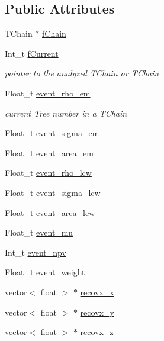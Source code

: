 \subsection*{Public Attributes}
\begin{DoxyCompactItemize}
\item 
T\+Chain $\ast$ \hyperlink{classXMLWriter_ac2efafff4308bbb27611c5d68b3700e1}{f\+Chain}
\item 
Int\+\_\+t \hyperlink{classXMLWriter_a48338ffb60a2aedec6db2f6695a967e5}{f\+Current}
\begin{DoxyCompactList}\small\item\em pointer to the analyzed T\+Chain or T\+Chain \end{DoxyCompactList}\item 
Float\+\_\+t \hyperlink{classXMLWriter_a792eee50e64e8475c85fe1feb31ad006}{event\+\_\+rho\+\_\+em}
\begin{DoxyCompactList}\small\item\em current Tree number in a T\+Chain \end{DoxyCompactList}\item 
Float\+\_\+t \hyperlink{classXMLWriter_aa34c15e694c8ea7cb6940104df3b2dd7}{event\+\_\+sigma\+\_\+em}
\item 
Float\+\_\+t \hyperlink{classXMLWriter_a815901645b4cb90c09124af8c8236e07}{event\+\_\+area\+\_\+em}
\item 
Float\+\_\+t \hyperlink{classXMLWriter_abc35debd3b3fb2b4560d7c344e8c40b3}{event\+\_\+rho\+\_\+lcw}
\item 
Float\+\_\+t \hyperlink{classXMLWriter_af6bc674bca504ca028b1f3cb14880677}{event\+\_\+sigma\+\_\+lcw}
\item 
Float\+\_\+t \hyperlink{classXMLWriter_a95de441bd545a6a6bf5d0c898daa8559}{event\+\_\+area\+\_\+lcw}
\item 
Float\+\_\+t \hyperlink{classXMLWriter_a05034f399d8605897b91c4b26a493a56}{event\+\_\+mu}
\item 
Int\+\_\+t \hyperlink{classXMLWriter_a2d3d5505eba607f6e335f25861086c09}{event\+\_\+npv}
\item 
Float\+\_\+t \hyperlink{classXMLWriter_af616379fb3ce609eb1d5bfa91cc0ba09}{event\+\_\+weight}
\item 
vector$<$ float $>$ $\ast$ \hyperlink{classXMLWriter_a565b883f221ca87147a5bedaedd097f3}{recovx\+\_\+x}
\item 
vector$<$ float $>$ $\ast$ \hyperlink{classXMLWriter_ad8416f28ca25bf8dc1bec17a80acc742}{recovx\+\_\+y}
\item 
vector$<$ float $>$ $\ast$ \hyperlink{classXMLWriter_ad27ad3f6ee33c16d39e23876a87a2f97}{recovx\+\_\+z}

\end{DoxyCompactItemize}
